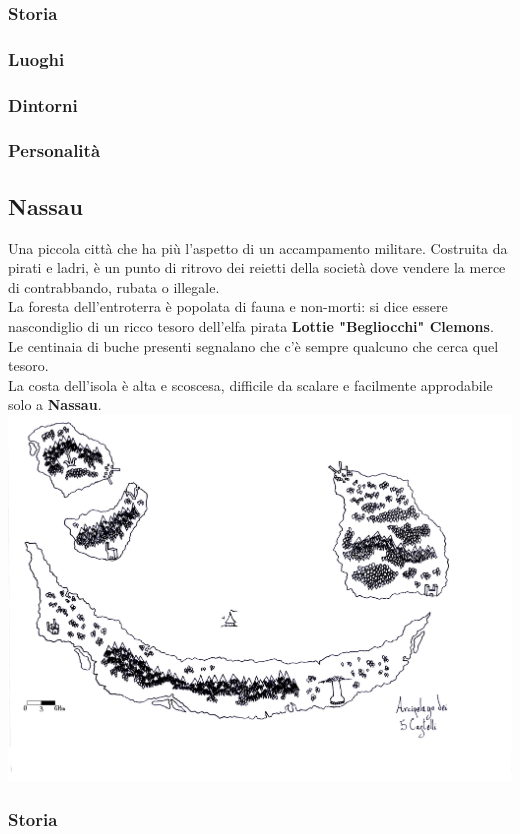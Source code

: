 \documentclass[10pt,twoside,onecolumn,openany]{book}
\begin{document}
\subsubsection{Storia}
\subsubsection{Luoghi}
\subsubsection{Dintorni}
\subsubsection{Personalità}
\newpage
\subsection{Nassau}
Una piccola città che ha più l'aspetto di un accampamento militare. Costruita da pirati e ladri, è un punto di ritrovo dei reietti della società dove vendere la merce di contrabbando, rubata o illegale.\\
La foresta dell'entroterra è popolata di fauna e non-morti: si dice essere nascondiglio di un ricco tesoro dell'elfa pirata \textbf{Lottie "Begliocchi" Clemons}. Le centinaia di buche presenti segnalano che c'è sempre qualcuno che cerca quel tesoro.\\
La costa dell'isola è alta e scoscesa, difficile da scalare e facilmente approdabile solo a \textbf{Nassau}.\\
\includegraphics[scale=0.75]{arccinqcastelli}
\subsubsection{Storia}
\end{document}
